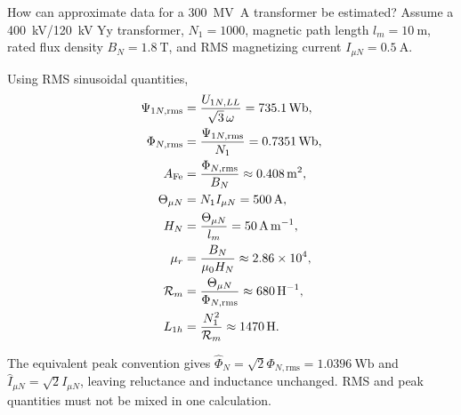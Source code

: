 \begin{formulaBox}{How can approximate data for a \SI{300}{\mega\volt\ampere} transformer be estimated?}
Assume a \SI{400}{\kilo\volt}/\SI{120}{\kilo\volt} Yy transformer,
$N_1=1000$, magnetic path length $l_m=\SI{10}{\metre}$, rated flux density
$B_N=\SI{1.8}{\tesla}$, and RMS magnetizing current
$I_{\mu N}=\SI{0.5}{\ampere}$.

Using RMS sinusoidal quantities,
\begin{align}
\Psi_{1N,\mathrm{rms}}
 &=\frac{U_{1N,LL}}{\sqrt{3}\,\omega}
  =\SI{735.1}{\weber},\\
\Phi_{N,\mathrm{rms}}
 &=\frac{\Psi_{1N,\mathrm{rms}}}{N_1}
  =\SI{0.7351}{\weber},\\
A_{\mathrm{Fe}}
 &=\frac{\Phi_{N,\mathrm{rms}}}{B_N}
  \approx\SI{0.408}{\metre\squared},\\
\Theta_{\mu N}&=N_1I_{\mu N}=\SI{500}{\ampere},\\
H_N&=\frac{\Theta_{\mu N}}{l_m}=\SI{50}{\ampere\per\metre},\\
\mu_r&=\frac{B_N}{\mu_0H_N}\approx2.86\times10^4,\\
\Rmag_m&=\frac{\Theta_{\mu N}}{\Phi_{N,\mathrm{rms}}}
 \approx\SI{680}{\per\henry},\\
L_{1h}&=\frac{N_1^2}{\Rmag_m}\approx\SI{1470}{\henry}.
\end{align}

The equivalent peak convention gives
$\widehat\Phi_N=\sqrt{2}\Phi_{N,\mathrm{rms}}
=\SI{1.0396}{\weber}$ and
$\widehat I_{\mu N}=\sqrt{2}I_{\mu N}$, leaving reluctance and inductance
unchanged. RMS and peak quantities must not be mixed in one calculation.
\end{formulaBox}

